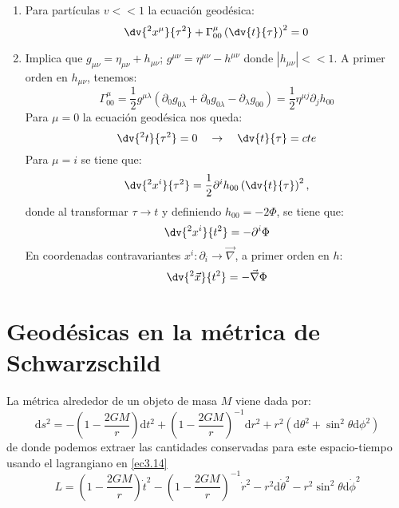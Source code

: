 \documentclass[../main]{subfiles}
\begin{document}
\begin{enumerate}
    \item Para partículas $v<<1$ la ecuación geodésica:
    \begin{equation}
        \dv{^2 x^{\mu}}{\tau^2}+\Gamma^{\mu}_{00}\left(\dv{t}{\tau}\right)^2=0
    \end{equation}
    \item Implica que $g_{\mu\nu}=\eta_{\mu\nu}+h_{\mu\nu}$; $g^{\mu\nu}=\eta^{\mu\nu}-h^{\mu\nu}$ donde $|h_{\mu\nu}|<<1$. A primer orden en $h_{\mu\nu}$, tenemos:
    \begin{equation}
        \Gamma^{\mu}_{00}=\dfrac{1}{2}g^{\mu\lambda}(\partial_0 g_{0\lambda}+\partial_0 g_{0\lambda}-\partial_{\lambda}g_{00})=\dfrac{1}{2}\eta^{\mu j}\partial_j h_00
    \end{equation}
    Para $\mu=0$ la ecuación geodésica nos queda:
    \begin{equation}
        \dv{^2 t}{\tau^2}=0 \quad \rightarrow \quad \dv{t}{\tau}=cte
    \end{equation}
    Para $\mu=i$ se tiene que:
    \begin{equation}
        \dv{^2 x^{i}}{\tau^2}=\dfrac{1}{2}\partial^{i}h_{00}\left(\dv{t}{\tau}\right)^2,
    \end{equation}
    donde al transformar $\tau \rightarrow t$ y definiendo $h_{00}=-2\Phi$, se tiene que:
    \begin{equation}
        \dv{^2 x^{i}}{t^2}=-\partial^{i}\Phi
    \end{equation}
    En coordenadas contravariantes $x^{i}:\partial_i \rightarrow \vec{\nabla}$, a primer orden en $h$:
    \begin{equation}
        \dv{^2 \vec{x}}{t^2}=-\vec{\nabla}\Phi
    \end{equation}
\end{enumerate}
\section{Geodésicas en la métrica de Schwarzschild}
La métrica alrededor de un objeto de masa $M$ viene dada por:
\begin{equation}
    \mathrm{d}s^2=-\left(1-\dfrac{2GM}{r}\right)\mathrm{d}t^2+\left(1-\dfrac{2GM}{r}\right)^{-1}\mathrm{d}r^2+r^2(\mathrm{d}\theta^2+\sin^2 \theta \mathrm{d}\phi^2)
\end{equation}
de donde podemos extraer las cantidades conservadas para este espacio-tiempo usando el lagrangiano en \eqref{ec3.14}
\begin{equation}
    L=\left(1-\dfrac{2GM}{r}\right)\dot{t}^2-\left(1-\dfrac{2GM}{r}\right)^{-1}\dot{r}^2-r^2\mathrm{d}\dot{\theta}^2-r^2\sin^2 \theta \mathrm{d}\dot{\phi}^2
\end{equation}
\end{document}

